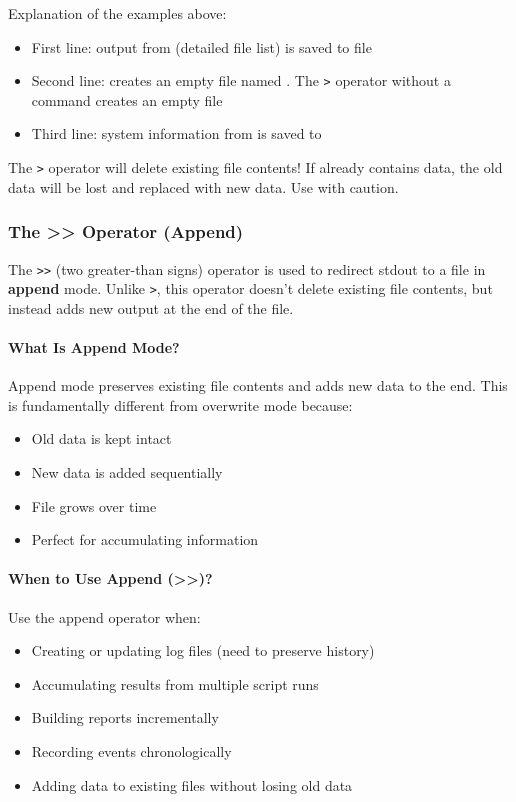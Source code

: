 Explanation of the examples above:
\begin{itemize}
	\item First line: output from  (detailed file list) is saved to file 
	\item Second line: creates an empty file named . The \texttt{>} operator without a command creates an empty file
	\item Third line: system information from  is saved to 
\end{itemize}

\begin{warningbox}
	The \texttt{>} operator will delete existing file contents! If  already contains data, the old data will be lost and replaced with new data. Use with caution.
\end{warningbox}

\subsubsection{The >> Operator (Append)}

The \texttt{>>} (two greater-than signs) operator is used to redirect stdout to a file in \textbf{append} mode. Unlike \texttt{>}, this operator doesn't delete existing file contents, but instead adds new output at the end of the file.

\paragraph{What Is Append Mode?}

Append mode preserves existing file contents and adds new data to the end. This is fundamentally different from overwrite mode because:
\begin{itemize}
	\item Old data is kept intact
	\item New data is added sequentially
	\item File grows over time
	\item Perfect for accumulating information
\end{itemize}

\paragraph{When to Use Append (>>)?}

Use the append operator when:
\begin{itemize}
	\item Creating or updating log files (need to preserve history)
	\item Accumulating results from multiple script runs
	\item Building reports incrementally
	\item Recording events chronologically
	\item Adding data to existing files without losing old data
\end{itemize}

